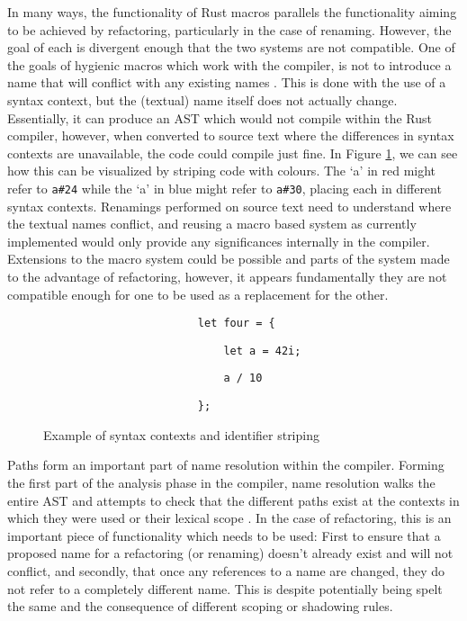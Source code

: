 In many ways, the functionality of Rust macros parallels the functionality aiming to be achieved by refactoring, particularly in the case of renaming. However, the goal of each is divergent enough that the two systems are not compatible. One of the goals of hygienic macros which work with the compiler, is not to introduce a name that will conflict with any existing names \cite{keep15}. This is done with the use of a syntax context, but the (textual) name itself does not actually change. Essentially, it can produce an AST which would not compile within the Rust compiler, however, when converted to source text where the differences in syntax contexts are unavailable, the code could compile just fine. In Figure \ref{Fig:striping}, we can see how this can be visualized by striping code with colours. The `a' in red might refer to {\verb|a#24|} while the `a' in blue might refer to {\verb|a#30|}, placing each in different syntax contexts. Renamings performed on source text need to understand where the textual names conflict, and reusing a macro based system as currently implemented would only provide any significances internally in the compiler. Extensions to the macro system could be possible and parts of the system made to the advantage of refactoring, however, it appears fundamentally they are not compatible enough for one to be used as a replacement for the other.

\begin{figure}
{\color{blue}
\verb|                        let four = {|
}

{\color{red}

\verb|                            let a = 42i;|
}

{
\color{blue}

\verb|                            a / 10|
}

{\color{red}

\verb|                        };|
}

\caption{Example of syntax contexts and identifier striping}
\label{Fig:striping}
\end{figure}

Paths form an important part of name resolution within the compiler. Forming the first part of the analysis phase in the compiler, name resolution walks the entire AST and attempts to check that the different paths exist at the contexts in which they were used or their lexical scope \cite{driver15}. In the case of refactoring, this is an important piece of functionality which needs to be used: First to ensure that a proposed name for a refactoring (or renaming) doesn't already exist and will not conflict, and secondly, that once any references to a name are changed, they do not refer to a completely different name. This is despite potentially being spelt the same and the consequence of different scoping or shadowing rules.

